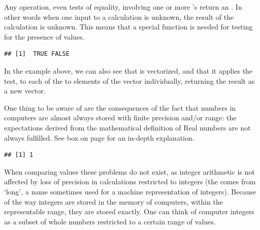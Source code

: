 \documentclass[krantz2]{krantz}\usepackage{knitr}%
\begin{document}
Any operation, even tests of equality, involving one or more 's return an . In other words when one input to a calculation is unknown, the result of the calculation is unknown. This means that a special function is needed for testing for the presence of  values.

\begin{knitrout}\footnotesize
{}\color{fgcolor}\begin{kframe}
\begin{alltt}
\hlstd{(}\hlstd{(}\hlstd{,} \hlstd{))}
\end{alltt}
\begin{verbatim}
## [1]  TRUE FALSE
\end{verbatim}
\end{kframe}
\end{knitrout}

In the example above, we can also see that  is vectorized, and that it applies the test, to each of the to elements of the vector individually, returning the result as a new vector.

One thing to be aware of are the consequences of the fact that numbers in computers are almost always stored with finite precision and/or range: the expectations derived from the mathematical definition of Real numbers are not always fulfilled. See box on page \pageref{box:floats} for an in-depth explanation.

\begin{knitrout}\footnotesize
{}\color{fgcolor}\begin{kframe}
\begin{alltt}
 \hlopt{-} 
\end{alltt}
\begin{verbatim}
## [1] 1
\end{verbatim}
\end{kframe}
\end{knitrout}

When comparing  values these problems do not exist, as integer arithmetic is not affected by loss of precision in calculations restricted to integers (the  comes from `long', a name sometimes used for a machine representation of integers). Because of the way integers are stored in the memory of computers, within the representable range, they are stored exactly. One can think of computer integers as a subset of whole numbers restricted to a certain range of values.
\end{document}
